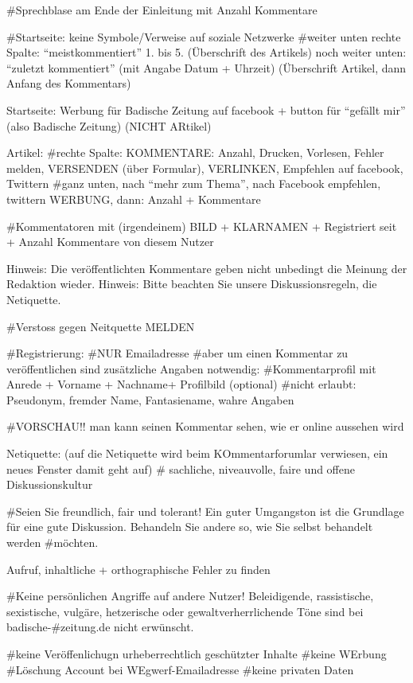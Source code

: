 #Sprechblase am Ende der Einleitung mit Anzahl Kommentare

#Startseite: keine Symbole/Verweise auf soziale Netzwerke
#weiter unten rechte Spalte: ``meistkommentiert'' 1. bis 5. (Überschrift des Artikels)
noch weiter unten: ``zuletzt kommentiert'' (mit Angabe Datum + Uhrzeit) (Überschrift Artikel, dann Anfang des Kommentars)

Startseite:
Werbung für Badische Zeitung auf facebook + button für ``gefällt mir'' (also Badische Zeitung) (NICHT ARtikel)

Artikel: 
#rechte Spalte: KOMMENTARE: Anzahl, Drucken, Vorlesen, Fehler melden, VERSENDEN (über Formular), VERLINKEN, Empfehlen auf facebook, Twittern
#ganz unten, nach ``mehr zum Thema'', nach Facebook empfehlen, twittern WERBUNG, dann: Anzahl + Kommentare

#Kommentatoren mit (irgendeinem) BILD + KLARNAMEN + Registriert seit + Anzahl Kommentare von diesem Nutzer

Hinweis: Die veröffentlichten Kommentare geben nicht unbedingt die Meinung der Redaktion wieder.
Hinweis: Bitte beachten Sie unsere Diskussionsregeln, die Netiquette.



#Verstoss gegen Neitquette MELDEN

#Registrierung:
#NUR Emailadresse
#aber um einen Kommentar zu veröffentlichen sind zusätzliche Angaben notwendig: 
 #Kommentarprofil mit Anrede + Vorname + Nachname+ Profilbild (optional) 
 #nicht erlaubt: Pseudonym, fremder Name, Fantasiename, wahre Angaben
 
 
 #VORSCHAU!! man kann seinen Kommentar sehen, wie er online aussehen wird
 
 
 Netiquette: (auf die Netiquette wird beim KOmmentarforumlar verwiesen, ein neues Fenster damit geht auf)
# sachliche, niveauvolle, faire und offene Diskussionskultur
 
#Seien Sie freundlich, fair und tolerant! Ein guter Umgangston ist die Grundlage für eine gute Diskussion. Behandeln Sie andere so, wie Sie selbst behandelt werden #möchten.

Aufruf, inhaltliche + orthographische Fehler zu finden

#Keine persönlichen Angriffe auf andere Nutzer! Beleidigende, rassistische, sexistische, vulgäre, hetzerische oder gewaltverherrlichende Töne sind bei badische-#zeitung.de nicht erwünscht.

#keine Veröffenlichugn urheberrechtlich geschützter Inhalte
#keine WErbung 
#Löschung Account bei WEgwerf-Emailadresse
#keine privaten Daten

